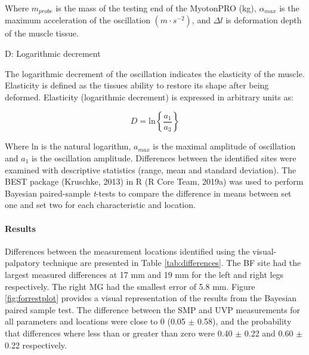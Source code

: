 \documentclass[man,floatsintext]{apa6}
\let\oldparagraph\paragraph
\renewcommand{\paragraph}[1]{\oldparagraph{#1}\mbox{}}
\begin{document}
\noindent Where \(m_{probe}\) is the mass of the testing end of the MyotonPRO (kg), \(\alpha_{max}\) is the maximum acceleration of the oscillation \((m\cdot s^{-2})\), and \({\Delta l}\) is deformation depth of the muscle tissue.

\noindent D: Logarithmic decrement

\noindent The logarithmic decrement of the oscillation indicates the elasticity of the muscle. Elasticity is defined as the tissues ability to restore its shape after being deformed.
Elasticity (logarithmic decrement) is expressed in arbitrary units as:

\begin{equation} 
  D = \text{ln} \left\{\frac{a_1}{a_3}\right\}
  \label{eq:decrement}
\end{equation}

\noindent Where \(\text{ln}\) is the natural logarithm, \(a_{max}\) is the maximal amplitude of oscillation and \(a_1\) is the oscillation amplitude.
Differences between the identified sites were examined with descriptive statistics (range, mean and standard deviation).
The BEST package (Kruschke, 2013) in R (R Core Team, 2019a) was used to perform Bayesian paired-sample \emph{t}-tests to compare the difference in means between set one and set two for each characteristic and location.

\hypertarget{results-1}{%
\paragraph{Results}\label{results-1}}

Differences between the measurement locations identified using the visual-palpatory technique are presented in Table \ref{tab:differences}.
The BF site had the largest measured differences at 17 mm and 19 mm for the left and right legs respectively. The right MG had the smallest error of 5.8 mm.
Figure \ref{fig:forrestplot} provides a visual representation of the results from the Bayesian paired sample test.
The difference between the SMP and UVP measurements for all parameters and locations were close to 0 (0.05 \(\pm\) 0.58), and the probability that differences where less than or greater than zero were 0.40 \(\pm\) 0.22 and 0.60 \(\pm\) 0.22 respectively.
\end{document}
